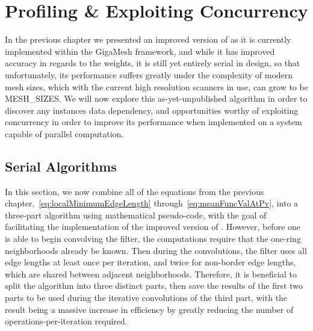 \chapter{Profiling \& Exploiting Concurrency}
\label{ch5}
In the previous chapter we presented an improved version of  as it is currently implemented within the GigaMesh framework, and while it has improved accuracy in regards to the weights, it is still yet entirely serial in design, so that unfortunately, its performance suffers greatly under the complexity of modern mesh sizes, which with the current high resolution scanners in use, can grow to be MESH\_SIZES. We will now explore this as-yet-unpublished algorithm in order to discover any instances data dependency, and opportunities worthy of exploiting concurrency in order to improve its performance when implemented on a system capable of parallel computation.

%
%
%
%
\section{Serial Algorithms}
\label{ch5sSI}
In this section, we now combine all of the equations from the previous chapter,~\ref{eq:localMinimumEdgeLength} through~\ref{eq:meanFuncValAtPv}, into a three-part algorithm using mathematical pseudo-code, with the goal of facilitating the implementation of the improved version of . However, before one is able to begin convolving the filter, the computations require that the one-ring neighborhoods already be known. Then during the convolutions, the filter uses all edge lengths at least once per iteration, and twice for non-border edge lengths, which are shared between adjacent neighborhoods. Therefore, it is beneficial to split the algorithm into three distinct parts, then save the results of the first two parts to be used during the iterative convolutions of the third part, with the result being a massive increase in efficiency by greatly reducing the number of operations-per-iteration required.

%
%
